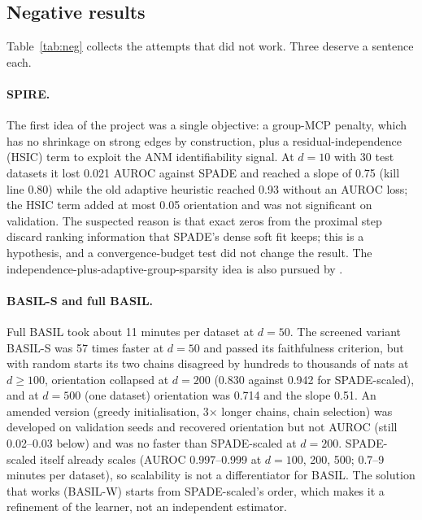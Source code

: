 \documentclass[11pt,a4paper]{article}
\begin{document}
\subsection{Negative results}
\label{sec:neg}

\begin{table}[t]
\centering
\caption{Negative and failed results kept in the paper.}
\label{tab:neg}

\end{table}

Table~\ref{tab:neg} collects the attempts that did not work. Three deserve a sentence each.

\paragraph{SPIRE.} The first idea of the project was a single objective: a group-MCP penalty, which has no shrinkage on strong edges by construction, plus a residual-independence (HSIC) term to exploit the ANM identifiability signal. At $d=10$ with 30 test datasets it lost 0.021 AUROC against SPADE and reached a slope of 0.75 (kill line 0.80) while the old adaptive heuristic reached 0.93 without an AUROC loss; the HSIC term added at most 0.05 orientation and was not significant on validation. The suspected reason is that exact zeros from the proximal step discard ranking information that SPADE's dense soft fit keeps; this is a hypothesis, and a convergence-budget test did not change the result. The independence-plus-adaptive-group-sparsity idea is also pursued by \citet{yao2026}.

\paragraph{BASIL-S and full BASIL.} Full BASIL took about 11 minutes per dataset at $d=50$. The screened variant BASIL-S was 57 times faster at $d=50$ and passed its faithfulness criterion, but with random starts its two chains disagreed by hundreds to thousands of nats at $d\ge100$, orientation collapsed at $d=200$ (0.830 against 0.942 for SPADE-scaled), and at $d=500$ (one dataset) orientation was 0.714 and the slope 0.51. An amended version (greedy initialisation, 3$\times$ longer chains, chain selection) was developed on validation seeds and recovered orientation but not AUROC (still 0.02--0.03 below) and was no faster than SPADE-scaled at $d=200$. SPADE-scaled itself already scales (AUROC 0.997--0.999 at $d=100$, 200, 500; 0.7--9 minutes per dataset), so scalability is not a differentiator for BASIL. The solution that works (BASIL-W) starts from SPADE-scaled's order, which makes it a refinement of the learner, not an independent estimator.
\end{document}
